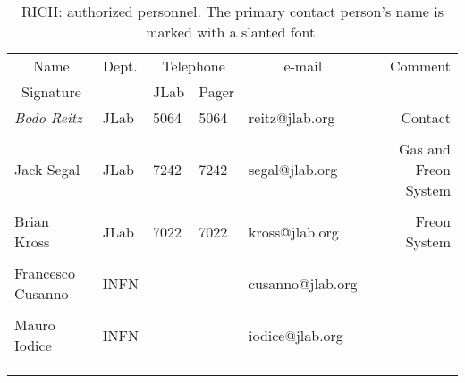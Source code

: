 \begin{table}[ht]
\begin{center}
\begin{tabular}{|l|l|l|l|l|r|} \hline
  \multicolumn{1}{|c|}{Name} & Dept. & \multicolumn{2}{c|}{Telephone} & 
  \multicolumn{1}{c|}{e-mail} & Comment \\ 
  \cline{1-1} \cline{3-4}
  \multicolumn{1}{|c|}{Signature}  &   & JLab & Pager &  & \\ 
\hline
 {\em Bodo Reitz}  & JLab    & 5064 & 5064 & reitz@jlab.org  & Contact     \\ 
                          &         &      &      &                 &             \\ \hline
 Jack        Segal        & JLab    & 7242 & 7242 & segal@jlab.org  &  Gas and Freon System \\
                           &         &      &      &                 &             \\ \hline
 Brian       Kross        & JLab    & 7022 & 7022 & kross@jlab.org  &  Freon System \\
                          &         &      &      &                 &             \\ \hline
 Francesco   Cusanno      & INFN    &      &      & cusanno@jlab.org & \\
                          &         &      &      &                 &             \\ \hline
 Mauro       Iodice       & INFN    &      &      & iodice@jlab.org & \\
                          &         &      &      &                 &             \\ \hline
                          &         &      &      &                 & \\
                          &         &      &      &                 &             \\ \hline
\end{tabular}
\end{center}
\caption[RICH: authorized personnel]{
   RICH: authorized personnel. The primary contact person's
   name is marked with a slanted font. 
}
\label{tab:rich:personnel}
\end{table}


